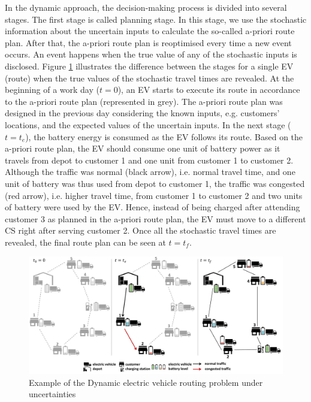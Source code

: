 \documentclass[11pt]{article}
\begin{document}
In the dynamic approach, the decision-making process is divided into several stages. The first stage is called planning stage. In this stage, we use the stochastic information about the uncertain inputs to calculate the so-called a-priori route plan. After that, the a-priori route plan is reoptimised every time a new event occurs. An event happens when the true value of any of the stochastic inputs is disclosed. Figure \ref{Fig1} illustrates the difference between the stages for a single EV (route) when the true values of the stochastic travel times are revealed. At the beginning of a work day ($t = 0$), an EV starts to execute its route in accordance to the a-priori route plan (represented in grey). The a-priori route plan was designed in the previous day considering the known inputs, e.g. customers' locations, and the expected values of the uncertain inputs. In the next stage ($t = t_e$), the battery energy is consumed as the EV follows its route. Based on the a-priori route plan, the EV should consume one unit of battery power as it travels from depot to customer 1 and one unit from customer 1 to customer 2. Although the traffic was normal (black arrow), i.e. normal travel time, and one unit of battery was thus used from depot to customer 1, the traffic was congested (red arrow), i.e. higher travel time, from customer 1 to customer 2 and two units of battery were used by the EV. Hence, instead of being charged after attending customer 3 as planned in the a-priori route plan, the EV must move to a different CS right after serving customer 2. Once all the stochastic travel times are revealed, the final route plan can be seen at $t = t_f$.

\begin{figure}[H]
\begin{centering}
  \includegraphics[width=1\linewidth]{Figure1.pdf}
    \caption{Example of the Dynamic electric vehicle routing problem under uncertainties}
     \label{Fig1}
     \end{centering}
\end{figure}
\end{document}
